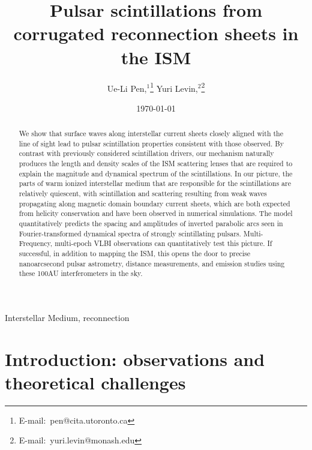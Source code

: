 \documentclass[useAMS,usenatbib]{mn2e}
\title[Interstellar Plasma Scattering]{
Pulsar scintillations from corrugated reconnection sheets in the ISM
}
\author[Pen and Levin]{Ue-Li
  Pen,$^{1}$\thanks{E-mail:\ pen@cita.utoronto.ca}
Yuri Levin,$^2$\thanks{E-mail:\ yuri.levin@monash.edu}
}
\begin{document}
\date{\today}

\pagerange{\pageref{firstpage}--\pageref{lastpage}} 

\maketitle
\label{firstpage}
\begin{abstract}

We show that surface waves along interstellar current sheets closely
aligned with the line of sight lead to pulsar scintillation properties
consistent with those observed.  By contrast with previously
considered scintillation drivers, our mechanism naturally produces the
length and density scales of the ISM scattering lenses that are
required to explain the magnitude and dynamical spectrum of the
scintillations.  In our picture, the parts of warm ionized
interstellar medium that are responsible for the scintillations are
relatively quiescent, with scintillation and scattering resulting from
weak waves propagating along magnetic domain boundary current sheets,
which are both expected from helicity conservation and have been
observed in numerical simulations.  The model quantitatively predicts
the spacing and amplitudes of inverted parabolic arcs seen in
Fourier-transformed dynamical spectra of strongly scintillating
pulsars. Multi-Frequency, multi-epoch VLBI observations can
quantitatively test this picture.  If successful, in addition to
mapping the ISM, this opens the door to precise nanoarcsecond pulsar
astrometry, distance measurements, and emission studies using these
100AU interferometers in the sky. 

\end{abstract}
\begin{keywords}
Interstellar Medium, reconnection
\end{keywords}

\newcommand{\be}{\begin{eqnarray}}
\newcommand{\ee}{\end{eqnarray}}
\newcommand{\beq}{\begin{equation}}
\newcommand{\eeq}{\end{equation}}

\section{Introduction: observations and theoretical challenges}
\end{document}
